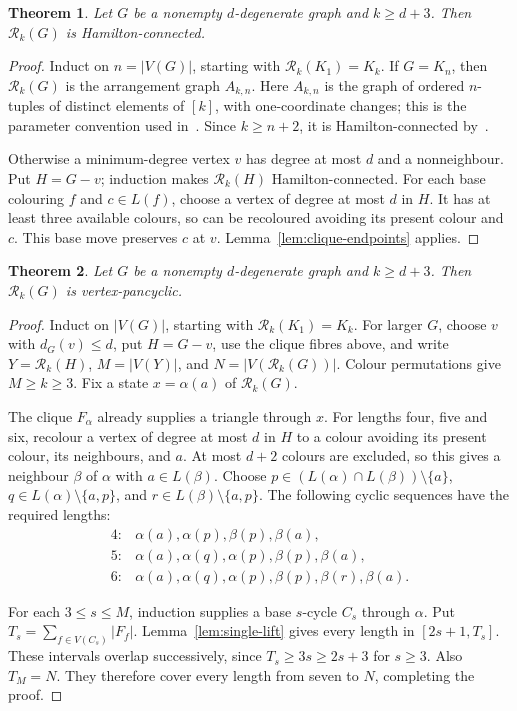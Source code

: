 \documentclass[11pt]{article}
\newtheorem{theorem}{Theorem}[section]
\theoremstyle{remark}
\newcommand{\Rk}{\mathcal R_k}
\numberwithin{equation}{section}
\numberwithin{table}{section}
\begin{document}
\begin{theorem}\label{thm:degenerate-hc}
Let $G$ be a nonempty $d$-degenerate graph and $k\ge d+3$.
Then $\Rk(G)$ is Hamilton-connected.
\end{theorem}
\begin{proof}
Induct on $n=|V(G)|$, starting with $\Rk(K_1)=K_k$.
If $G=K_n$, then $\Rk(G)$ is the arrangement graph $A_{k,n}$.
Here $A_{k,n}$ is the graph of ordered $n$-tuples of distinct elements of
$[k]$, with one-coordinate changes; this is the parameter convention used
in~\cite{HLTH04}.  Since $k\ge n+2$, it is Hamilton-connected
by~\cite[Theorem~1]{HLTH04}.

Otherwise a minimum-degree vertex $v$ has degree at most $d$ and
a nonneighbour. Put $H=G-v$; induction makes $\Rk(H)$
Hamilton-connected. For each base colouring $f$ and $c\in L(f)$,
choose a vertex of degree at most $d$ in $H$. It has at least three
available colours, so can be recoloured avoiding its present colour
and $c$. This base move preserves $c$ at $v$.
Lemma~\ref{lem:clique-endpoints} applies.
\end{proof}

\begin{theorem}\label{thm:degenerate-vp}
Let $G$ be a nonempty $d$-degenerate graph and $k\ge d+3$.
Then $\Rk(G)$ is vertex-pancyclic.
\end{theorem}

\begin{proof}
Induct on $|V(G)|$, starting with $\Rk(K_1)=K_k$. For larger $G$,
choose $v$ with $d_G(v)\le d$, put $H=G-v$, use the clique fibres
above, and write $Y=\Rk(H)$, $M=|V(Y)|$, and $N=|V(\Rk(G))|$.
Colour permutations give $M\ge k\ge3$.
Fix a state $x=\alpha(a)$ of $\Rk(G)$.

The clique $F_\alpha$ already supplies a triangle through $x$.
For lengths four, five and six, recolour a vertex of degree at most
$d$ in $H$ to a colour avoiding its present colour, its neighbours,
and $a$. At most $d+2$ colours are excluded, so this gives a neighbour
$\beta$ of $\alpha$ with $a\in L(\beta)$.
Choose $p\in(L(\alpha)\cap L(\beta))\setminus\{a\}$,
$q\in L(\alpha)\setminus\{a,p\}$, and
$r\in L(\beta)\setminus\{a,p\}$.
The following cyclic sequences have the required lengths:
\[
\begin{array}{ll}
4:&\alpha(a),\alpha(p),\beta(p),\beta(a),\\
5:&\alpha(a),\alpha(q),\alpha(p),\beta(p),\beta(a),\\
6:&\alpha(a),\alpha(q),\alpha(p),\beta(p),\beta(r),\beta(a).
\end{array}
\]

For each $3\le s\le M$, induction supplies a base $s$-cycle $C_s$
through $\alpha$. Put $T_s=\sum_{f\in V(C_s)}|F_f|$.
Lemma~\ref{lem:single-lift} gives every length in $[2s+1,T_s]$.
These intervals overlap successively, since $T_s\ge3s\ge2s+3$
for $s\ge3$. Also $T_M=N$. They therefore cover every length
from seven to $N$, completing the proof.
\end{proof}
\end{document}
